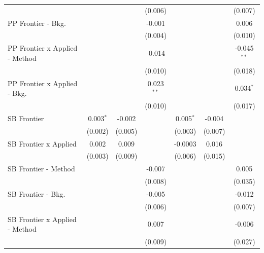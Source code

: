 \begin{tabular}{lcccccc}
                                  &             &              & (0.006)      &             &               & (0.007)\\   
   PP Frontier - Bkg.             &             &              & -0.001       &             &               & 0.006\\   
                                  &             &              & (0.004)      &             &               & (0.010)\\   
   PP Frontier x Applied - Method &             &              & -0.014       &             &               & -0.045$^{**}$\\   
                                  &             &              & (0.010)      &             &               & (0.018)\\   
   PP Frontier x Applied - Bkg.   &             &              & 0.023$^{**}$ &             &               & 0.034$^{*}$\\   
                                  &             &              & (0.010)      &             &               & (0.017)\\   
   SB Frontier                    & 0.003$^{*}$ & -0.002       &              & 0.005$^{*}$ & -0.004        &   \\   
                                  & (0.002)     & (0.005)      &              & (0.003)     & (0.007)       &   \\   
   SB Frontier x Applied          & 0.002       & 0.009        &              & -0.0003     & 0.016         &   \\   
                                  & (0.003)     & (0.009)      &              & (0.006)     & (0.015)       &   \\   
   SB Frontier - Method           &             &              & -0.007       &             &               & 0.005\\   
                                  &             &              & (0.008)      &             &               & (0.035)\\   
   SB Frontier - Bkg.             &             &              & -0.005       &             &               & -0.012\\   
                                  &             &              & (0.006)      &             &               & (0.007)\\   
   SB Frontier x Applied - Method &             &              & 0.007        &             &               & -0.006\\   
                                  &             &              & (0.009)      &             &               & (0.027)\\   

\end{tabular}
